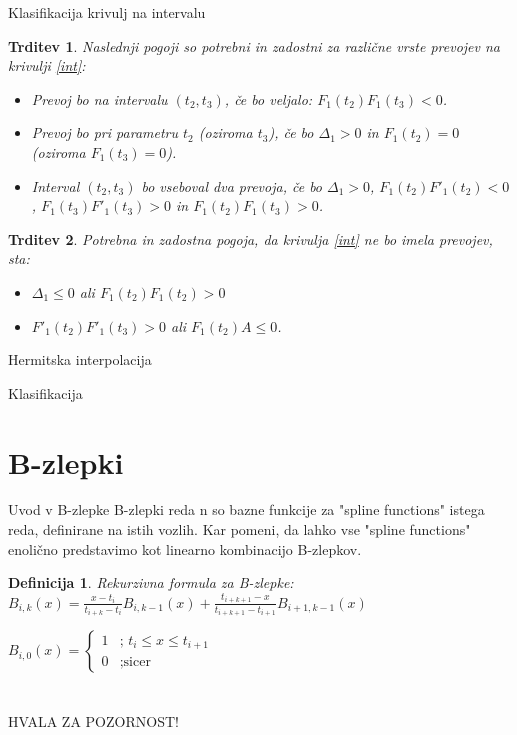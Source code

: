 \documentclass{beamer} %
\newtheorem{trditev}{Trditev}
\newtheorem{definicija}{Definicija}
\begin{document}
\begin{frame}{Klasifikacija krivulj na intervalu}
	\begin{trditev}
		Naslednji pogoji so potrebni in zadostni za različne vrste prevojev na krivulji \eqref{int}:
		\begin{itemize}
			\item Prevoj bo na intervalu $(t_2, t_3)$, če bo veljalo:
			$F_1(t_2)F_1(t_3) <0$.
			\item Prevoj bo pri parametru $t_2$ (oziroma $t_3$), če bo
			$\Delta_1 > 0$ in $F_1(t_2) = 0$ (oziroma $F_1(t_3) = 0$).
			\item Interval $(t_2, t_3)$ bo vseboval dva prevoja, če bo $\Delta_1 >0 $, $F_1(t_2)F'_1(t_2) <0$, $F_1(t_3)F'_1(t_3) >0$ in $F_1(t_2)F_1(t_3) >0$. 
		\end{itemize}
	\end{trditev}
	\begin{trditev}
		Potrebna in zadostna pogoja, da krivulja \eqref{int} ne bo imela prevojev, sta:
		\begin{itemize}
			\item $\Delta_1 \leq 0$ ali $F_1(t_2)F_1(t_2) > 0$
			\item $F'_1(t_2)F'_1(t_3)>0$ ali $F_1(t_2)A \leq 0$.
		\end{itemize}
	\end{trditev}
\end{frame}

\begin{frame}{Hermitska interpolacija}
	
\end{frame}

\begin{frame}{Klasifikacija}
	
\end{frame}
\section{B-zlepki}
\begin{frame}{Uvod v B-zlepke}
	B-zlepki reda n so bazne funkcije za "spline functions" istega reda, definirane na istih vozlih. Kar pomeni, da lahko vse "spline functions" enolično predstavimo kot linearno kombinacijo B-zlepkov.
	\begin{definicija}
	Rekurzivna formula za B-zlepke:\\
	$B_{i,k}(x)= \frac{x-t_i}{t_{i+k}-t_i} B_{i,k-1}(x) +  \frac{t_{i+k+1}-x}{t_{i+k+1}-t_{i+1}} B_{i+1,k-1}(x) $
	
  $B_{i,0}(x) =
  \begin{cases}
    1 & \text{; $t_i \le x \le t_{i+1}$} \\
    0 & \text{;sicer}
  \end{cases}$

	\end{definicija}
\end{frame}

\section{}
\begin{frame}
\begin{center}
HVALA ZA POZORNOST! 
\end{center}
\end{frame}

 
\end{document}
